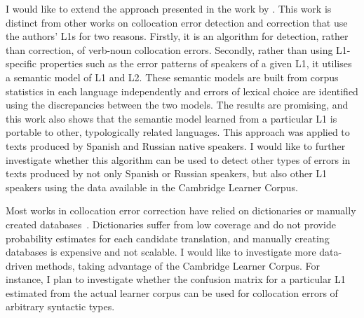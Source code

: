 \documentclass[11pt]{article}
\begin{document}
I would like to extend the approach presented in the work by 
\cite{kochmarcross}. This work is distinct from other works on collocation 
error detection and correction that use the authors' L1s for two reasons. 
Firstly, it is an algorithm for detection, rather than correction, of verb-noun collocation errors. Secondly, rather than using L1-specific properties 
such as the error patterns of speakers of a given L1, it utilises a semantic 
model of L1 and L2. These semantic models are built from corpus statistics in 
each language independently and errors of lexical choice are identified using the 
discrepancies between the two models. The results are promising, and this work also 
shows that the semantic model learned from a particular L1 is portable to other, 
typologically related languages. This approach was applied to texts produced by 
Spanish and Russian native speakers. I would like to further investigate whether 
this algorithm can be used to detect other types of errors in texts produced by 
not only Spanish or Russian speakers, but also other L1 speakers using the data available in the Cambridge Learner Corpus.
					
Most works in collocation error correction have relied on dictionaries or 
manually created databases~\citep{shei2000esl, wible2003bootstrapping, 
futagi2008computational}. Dictionaries suffer from low coverage and do not 
provide probability estimates for each candidate translation, and manually 
creating databases is expensive and not scalable. I would like to investigate 
more data-driven methods, taking advantage of the Cambridge Learner Corpus. For 
instance, I plan to investigate whether the confusion matrix for a particular L1 
estimated from the actual learner corpus can be used for collocation errors of 
arbitrary syntactic types.
\end{document}
